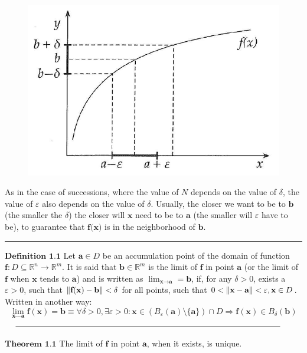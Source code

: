 \documentclass[0pt, a4paper]{article}
\begin{document}
\begin{figure}[h] \centering \includegraphics[scale=0.3]{images/figure_01_12.png} \end{figure}

As in the case of successions, where the value of $N$ depends on the value of $\delta$, the value of $\varepsilon$ also depends on the value of $\delta$. Usually, the closer we want to be to $\textbf{b}$ (the smaller the $\delta$) the closer will $\textbf{x}$ need to be to $\textbf{a}$ (the smaller will $\varepsilon$ have to be), to guarantee that $\textbf{f(x)}$ is in the neighborhood of $\textbf{b}$.


\noindent\rule{\textwidth}{1pt}

$\textbf{Definition 1.1}$ Let $\textbf{a} \in D$ be an accumulation point of the domain of function $\textbf{f}: D \subseteq \mathbb{R}^n \to \mathbb{R}^m$. It is said that $\textbf{b} \in \mathbb{R}^m$ is the limit of $\textbf{f}$ in point $\textbf{a}$ (or the limit of $\textbf{f}$ when $\textbf{x}$ tends to $\textbf{a}$) and is written as $\lim_{\textbf{x}\to \textbf{a}}=\textbf{b}$, if, for any $\delta >0$, exists a $\varepsilon >0$, such that $\norm{\textbf{f}(\textbf{x})-\textbf{b}}<\delta$ for all points, such that $0<\norm{\textbf{x}-\textbf{a}}<\varepsilon, \textbf{x}\in D$. Written in another way: 
$$ \lim_{\textbf{x}\to \textbf{a}} \textbf{f}(\textbf{x}) =\textbf{b} \equiv \forall \delta>0, \exists\varepsilon>0:\textbf{x}\in(B_\varepsilon(\textbf{a})\setminus\{\textbf{a}\})\cap D \Rightarrow \textbf{f}(\textbf{x}) \in B_\delta(\textbf{b}) $$
$\noindent\rule{\textwidth}{1pt}$

$\textbf{Theorem 1.1}$ The limit of $\textbf{f}$ in point $\textbf{a}$, when it exists, is unique.
\end{document}
